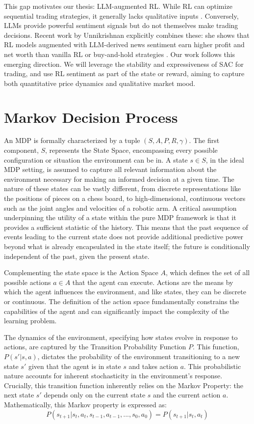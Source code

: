 This gap motivates our thesis: \gls{LLM}-augmented \gls{RL}. While \gls{RL} can optimize sequential trading strategies, it generally lacks qualitative inputs \cite{Hambly2023}. Conversely, \gls{LLM}s provide powerful sentiment signals but do not themselves make trading decisions. Recent work by Unnikrishnan explicitly combines these: she shows that \gls{RL} models augmented with \gls{LLM}-derived news sentiment earn higher profit and net worth than vanilla \gls{RL} or buy-and-hold strategies \cite{Unnikrishnan2024}. Our work follows this emerging direction. We will leverage the stability and expressiveness of \gls{SAC} for trading, and use \gls{RL} sentiment as part of the state or reward, aiming to capture both quantitative price dynamics and qualitative market mood.

\section{Markov Decision Process}
\label{sec:mdp}
An \gls{MDP} is formally characterized by a tuple \((S, A, P, R, \gamma)\). The first component, \(S\), represents the State Space, encompassing every possible configuration or situation the environment can be in. A state \(s \in S\), in the ideal \gls{MDP} setting, is assumed to capture all relevant information about the environment necessary for making an informed decision at a given time. The nature of these states can be vastly different, from discrete representations like the positions of pieces on a chess board, to high-dimensional, continuous vectors such as the joint angles and velocities of a robotic arm. A critical assumption underpinning the utility of a state within the pure \gls{MDP} framework is that it provides a sufficient statistic of the history. This means that the past sequence of events leading to the current state does not provide additional predictive power beyond what is already encapsulated in the state itself; the future is conditionally independent of the past, given the present state.

Complementing the state space is the Action Space \(A\), which defines the set of all possible actions \(a \in A\) that the agent can execute. Actions are the means by which the agent influences the environment, and like states, they can be discrete or continuous. The definition of the action space fundamentally constrains the capabilities of the agent and can significantly impact the complexity of the learning problem.

The dynamics of the environment, specifying how states evolve in response to actions, are captured by the Transition Probability Function \(P\). This function, \(P(s' | s, a)\), dictates the probability of the environment transitioning to a new state \(s'\) given that the agent is in state \(s\) and takes action \(a\). This probabilistic nature accounts for inherent stochasticity in the environment's response. Crucially, this transition function inherently relies on the Markov Property: the next state \(s'\) depends only on the current state \(s\) and the current action \(a\). Mathematically, this Markov property is expressed as:
\[P(s_{t+1}| s_t, a_t, s_{t-1}, a_{t-1}, ..., s_0, a_0) = P(s_{t+1} | s_t, a_t)\]

